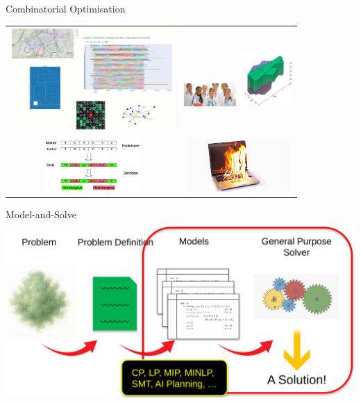 \documentclass{cons-beamer}
\begin{document}
\begin{frame}{Combinatorial Optimisation}
  \begin{center}
    \begin{tabular}{c c} %
      \includegraphics[height=40mm]{images/CO_examples} &
        \includegraphics[width=20mm]{images/physicians} \includegraphics[height=20mm]{images/sectorLondon} \\
      \includegraphics[height=20mm]{images/genotype-haplotype} &
        \includegraphics[height=20mm]{images/burningLaptop}
    \end{tabular}
  \end{center}
\end{frame}

\begin{frame}{Model-and-Solve}
  \centering
  \includegraphics[height=68mm]{images/prob2sol}
\end{frame}
\end{document}
